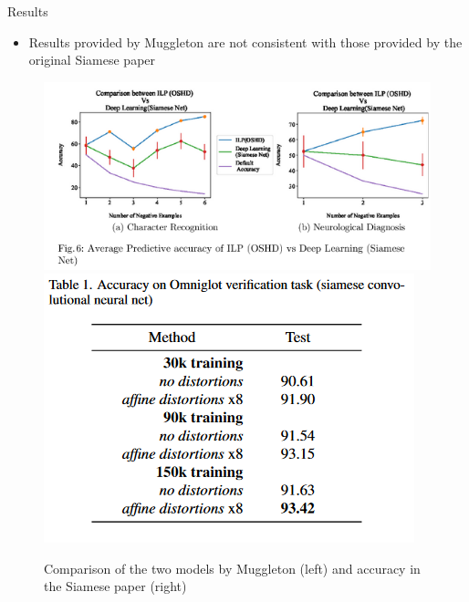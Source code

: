 \begin{frame}{Results}

\begin{itemize}
    \item Results provided by Muggleton are not consistent with those provided by the original Siamese paper
\end{itemize}

\begin{figure}
    \centering
    \includegraphics[scale=0.45]{images/SiameseNN v ILP.png}
    \includegraphics[scale=0.45]{images/Accuracy SiameseNN.png}
    \caption{Comparison of the two models by Muggleton (left) and accuracy in the Siamese paper (right)}
\end{figure}    
    
\end{frame}

